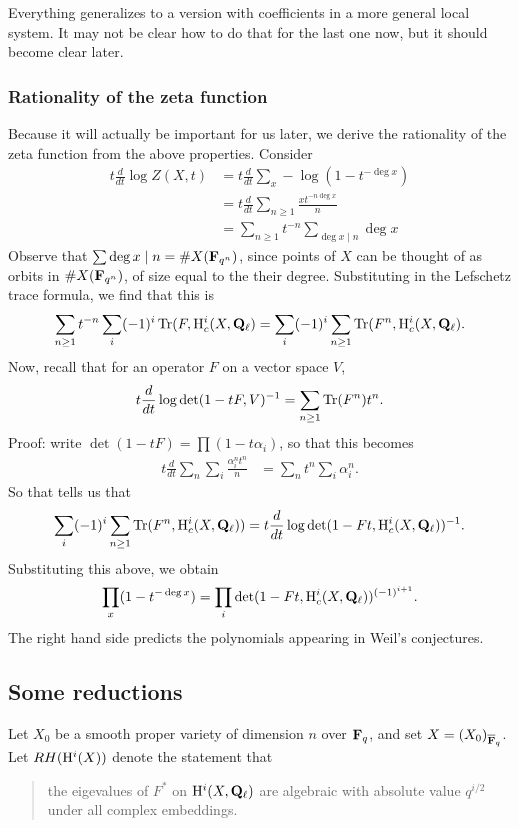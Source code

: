 Everything generalizes to a version with coefficients in a more general local system. It may not be clear how to do that for the last one now, but it should become clear later. 

\subsubsection{Rationality of the zeta function}
Because it will actually be important for us later, we derive the rationality of the zeta function from the above properties. Consider 
\begin{align*}
t \frac{d}{dt} \log Z(X,t) &= t \frac{d}{dt} \sum_x -\log(1-t^{-\deg x})\\
&= t \frac{d}{dt} \sum_{n \geq 1} \frac{ x t^{-n \deg x}}{n} \\
&= \sum_{n \geq 1} t^{-n} \sum_{\deg x \mid n } \deg x
\end{align*}
Observe that $\sum \deg x \mid n = \# X(\mathbf{F}_{q^n})$, since points of $X$ can be thought of as orbits in $\# X(\mathbf{F}_{q^n})$, of size equal to the their degree. Substituting in the Lefschetz trace formula, we find that this is 
\[
\sum_{n \geq 1} t^{-n} \sum_i (-1)^i \operatorname{Tr}(F, \mathrm{H}_c^i(X, \mathbf{Q}_{\ell})  = \sum_i (-1)^i \sum_{n \geq 1} \operatorname{Tr}(F^n, \mathrm{H}_c^i(X, \mathbf{Q}_{\ell}).
\]
Now, recall that for an operator $F$ on a vector space $V$, 
\[
t \frac{d}{dt} \log \det (1-tF, V)^{-1}= \sum_{n \geq 1} \operatorname{Tr}(F^n) t^n.
\]
Proof: write $\det (1-tF) = \prod (1-t\alpha_i)$, so that this becomes
\begin{align*}
t \frac{d}{dt}  \sum_n \sum_i \frac{\alpha_i^n t^n}{n} &= \sum_n t^n \sum_i \alpha_i^n .
\end{align*}
So that tells us that 
\[
\sum_i (-1)^i \sum_{n \geq 1} \operatorname{Tr}(F^n, \mathrm{H}_c^i(X, \mathbf{Q}_{\ell})) = t \frac{d}{dt} \log \det(1-Ft, \mathrm{H}_c^i(X, \mathbf{Q}_{\ell}))^{-1}.
\]
Substituting this above, we obtain 
\[
\prod_x (1-t^{-\deg x}) =  \prod_i \det(1-Ft, \mathrm{H}_c^i(X, \mathbf{Q}_{\ell}))^{(-1)^{i+1}}.
\]
The right hand side predicts the polynomials appearing in Weil's conjectures.


\subsection{Some reductions}

Let $X_0$ be a smooth proper variety of dimension $n$ over $\mathbf{F}_q$, and set $X = (X_0)_{\overline{\mathbf{F}}_q}$. Let $RH(\mathrm{H}^i(X))$ denote the statement that

\begin{quote}
 the eigevalues of $F^*$ on $\mathrm{H}^i(X, \mathbf{Q}_{\ell})$ are algebraic with absolute value $q^{i/2}$ under all complex embeddings.
 \end{quote}
 
